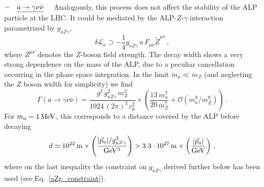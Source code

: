 \documentclass[11pt]{article}
\newcommand{\m}{\mu}
\renewcommand{\m}{\mu}
\newcommand{\n}{\nu}
\renewcommand{\to}{\rightarrow}
\newcommand{\beq}{\begin{equation}}
\newcommand{\eeq}{\end{equation}}
\renewcommand{\[}{\begin{equation}}
\renewcommand{\]}{\end{equation}}
\newcommand{\LL}{\mathscr{L}}
\begin{document}
 \vspace{2mm}
  \noindent $- \quad {\uline{a\to\gamma\nu\bar{\nu}}}\quad$ Analogously, this process does not affect the stability of the ALP particle at the LHC.  It could be mediated by the ALP-$Z$-$\gamma$ interaction parametrized by $g_{aZ\gamma}$,
 \beq
 \delta\LL_a \supset  - \frac{1}{4}g_{aZ\gamma} \,a\,F_{\m\n}\tilde{Z}^{\m\n}\,,
 \label{gaZgamma-def}
 \eeq
 where $Z^{\m\n}$ denotes the $Z$-boson field strength.  
  The decay width shows a very strong dependence on the mass of the ALP, due to a 
 peculiar cancellation occurring in the phase space integration. In the limit $m_a\ll m_Z$ (and neglecting  
  the $Z$ boson width for simplicity) 
 we find
\begin{equation}
\Gamma(a\to\gamma\nu\bar{\nu}) = \frac{g^2\,g_{aZ\gamma}^2\,m_Z^3}{1024\, (2\pi)^3\,c_{\theta}^2} \times \left( \frac{13}{20}\frac{m_a^7}{m_Z^7} + \mathcal{O}(m_a^{9}/m_Z^{9})\right)\,.
\end{equation} 
% 
For $m_a=\unit[1]{MeV}$,  this corresponds to a distance covered by the ALP before decaying
\begin{equation}
d\simeq \unit[10^{22}]{m} \times \left(\frac{|\vec{p}_a|/g_{aZ\gamma}^2}{\unit{GeV^3}}\right)>  3.3 \cdot \unit[10^{27}]{m} \times \left(\frac{|\vec{p}_a|}{\unit{GeV}}\right)\,,
\end{equation} 
 where  on the last inequality the constraint on $g_{aZ\gamma}$ derived   further below has been used (see Eq.~\eqref{aZg_constraint}).  
 

  
\end{document}
